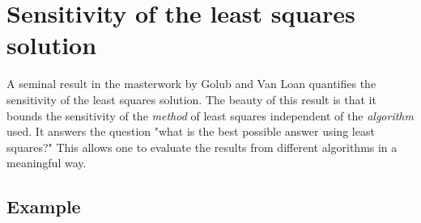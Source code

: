 \section[Sensitivity]{Sensitivity of the least squares solution}

A seminal result in the masterwork by Golub and Van Loan quantifies the sensitivity of the least squares solution. The beauty of this result is that it bounds the sensitivity of the \emph{method} of least squares independent of the \emph{algorithm} used. It answers the question "what is the best possible answer using least squares?" This allows one to evaluate the results from different algorithms in a meaningful way.

\subsection[]{Example}


\endinput